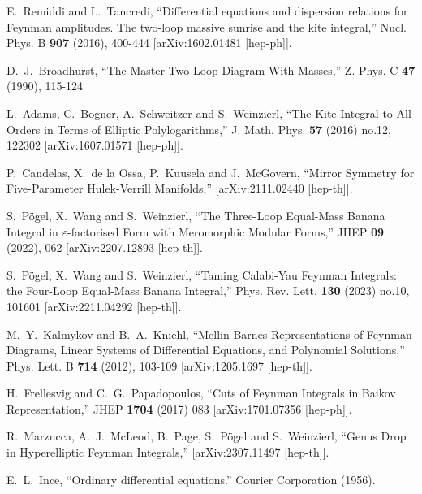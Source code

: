 \documentclass[a4paper,12pt]{article}
\numberwithin{equation}{section}
\numberwithin{figure}{section}
\begin{document}
\begin{thebibliography}{99}
E.~Remiddi and L.~Tancredi,
``Differential equations and dispersion relations for Feynman amplitudes. The two-loop massive sunrise and the kite integral,''
Nucl. Phys. B \textbf{907} (2016), 400-444
[arXiv:1602.01481 [hep-ph]].


D.~J.~Broadhurst,
``The Master Two Loop Diagram With Masses,''
Z. Phys. C \textbf{47} (1990), 115-124
  
L.~Adams, C.~Bogner, A.~Schweitzer and S.~Weinzierl,
``The Kite Integral to All Orders in Terms of Elliptic Polylogarithms,''
J. Math. Phys. \textbf{57} (2016) no.12, 122302
[arXiv:1607.01571 [hep-ph]].

P.~Candelas, X.~de la Ossa, P.~Kuusela and J.~McGovern,
``Mirror Symmetry for Five-Parameter Hulek-Verrill Manifolds,''
[arXiv:2111.02440 [hep-th]].

S.~P\"ogel, X.~Wang and S.~Weinzierl,
``The Three-Loop Equal-Mass Banana Integral in \ensuremath{\varepsilon}-factorised Form with Meromorphic Modular Forms,''
JHEP \textbf{09} (2022), 062
[arXiv:2207.12893 [hep-th]].


S.~P\"ogel, X.~Wang and S.~Weinzierl,
``Taming Calabi-Yau Feynman Integrals: the Four-Loop Equal-Mass Banana Integral,''
Phys. Rev. Lett. \textbf{130} (2023) no.10, 101601
[arXiv:2211.04292 [hep-th]].


M.~Y.~Kalmykov and B.~A.~Kniehl,
``Mellin-Barnes Representations of Feynman Diagrams, Linear Systems of Differential Equations, and Polynomial Solutions,''
Phys. Lett. B \textbf{714} (2012), 103-109
[arXiv:1205.1697 [hep-th]].
  
  H.~Frellesvig and C.~G.~Papadopoulos,
  ``Cuts of Feynman Integrals in Baikov Representation,''
  JHEP {\bf 1704} (2017) 083
  [arXiv:1701.07356 [hep-ph]].
  
R.~Marzucca, A.~J.~McLeod, B.~Page, S.~P\"ogel and S.~Weinzierl,
``Genus Drop in Hyperelliptic Feynman Integrals,''
[arXiv:2307.11497 [hep-th]].

 E.~L.~Ince, ``Ordinary differential equations.''
  Courier Corporation  (1956).
 


\end{thebibliography}
\end{document}
